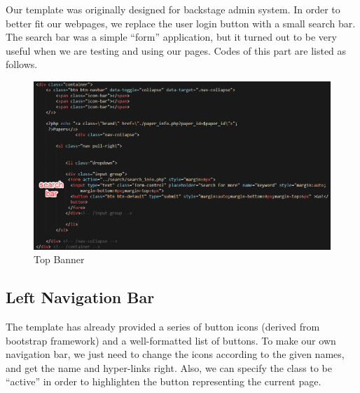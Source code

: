 \documentclass{book}
\begin{document}
Our template was originally designed for backstage admin system. In order to better fit our webpages, we replace the user login button with a small search bar. The search bar was a simple ``form'' application, but it turned out to be very useful when we are testing and using our pages. Codes of this part are listed as follows.

\begin{figure}[H]
\centering{}
\includegraphics[scale=0.35]{img/zlt_beau_codes.png}
\caption{Top Banner}
\end{figure}


\subsection {Left Navigation Bar}

The template has already provided a series of button icons (derived from bootstrap framework) and a well-formatted list of buttons. To make our own navigation bar, we just need to change the icons according to the given names, and get the name and hyper-links right. Also, we can specify the class to be ``active'' in order to highlighten the button representing the current page.
\end{document}
